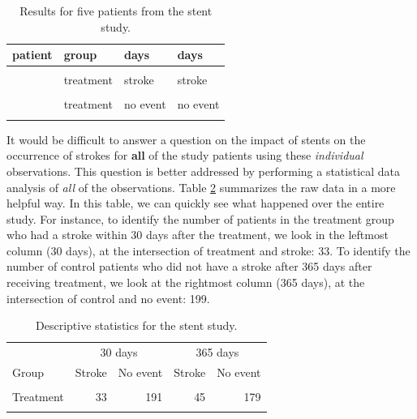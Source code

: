 \documentclass[
  10pt,
  openany]{book}
\begin{document}
\begin{table}[!h]

\caption{\label{tab:stentStudyResultsDF}Results for five patients from the stent study.}
\centering
\begin{tabular}[t]{>{\raggedright\arraybackslash}p{8em}>{\raggedright\arraybackslash}p{8em}>{\raggedright\arraybackslash}p{8em}>{\raggedright\arraybackslash}p{8em}}
\toprule
patient & group & 30 days & 365 days\\
\midrule
\cellcolor{gray!6}{1} & \cellcolor{gray!6}{treatment} & \cellcolor{gray!6}{no event} & \cellcolor{gray!6}{no event}\\
2 & treatment & stroke & stroke\\
\cellcolor{gray!6}{3} & \cellcolor{gray!6}{treatment} & \cellcolor{gray!6}{no event} & \cellcolor{gray!6}{no event}\\
4 & treatment & no event & no event\\
\cellcolor{gray!6}{5} & \cellcolor{gray!6}{control} & \cellcolor{gray!6}{no event} & \cellcolor{gray!6}{no event}\\
\bottomrule
\end{tabular}
\end{table}

It would be difficult to answer a question on the impact of stents on the occurrence of strokes for \textbf{all} of the study patients using these \emph{individual} observations.
This question is better addressed by performing a statistical data analysis of \emph{all} of the observations.
Table \ref{tab:stentStudyResultsDFsummary} summarizes the raw data in a more helpful way.
In this table, we can quickly see what happened over the entire study.
For instance, to identify the number of patients in the treatment group who had a stroke within 30 days after the treatment, we look in the leftmost column (30 days), at the intersection of treatment and stroke: 33.
To identify the number of control patients who did not have a stroke after 365 days after receiving treatment, we look at the rightmost column (365 days), at the intersection of control and no event: 199.

\begin{table}[!h]

\caption{\label{tab:stentStudyResultsDFsummary}Descriptive statistics for the stent study.}
\centering
\begin{tabular}[t]{lrrrr}
\toprule
\multicolumn{1}{c}{ } & \multicolumn{2}{c}{30 days} & \multicolumn{2}{c}{365 days} \\
\cmidrule(l{3pt}r{3pt}){2-3} \cmidrule(l{3pt}r{3pt}){4-5}
Group & Stroke & No event & Stroke & No event\\
\midrule
\cellcolor{gray!6}{Control} & \cellcolor{gray!6}{13} & \cellcolor{gray!6}{214} & \cellcolor{gray!6}{28} & \cellcolor{gray!6}{199}\\
Treatment & 33 & 191 & 45 & 179\\
\cellcolor{gray!6}{Total} & \cellcolor{gray!6}{46} & \cellcolor{gray!6}{405} & \cellcolor{gray!6}{73} & \cellcolor{gray!6}{378}\\
\bottomrule
\end{tabular}
\end{table}
\end{document}
